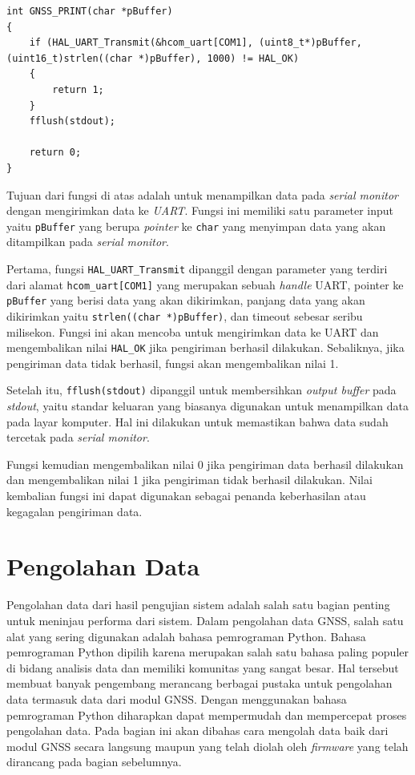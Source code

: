 \vspace{0.3cm}
\begin{lstlisting}[style=mystyle, caption={Fungsi \texttt{GNSS\_PRINT}}, label={lst: 3-gnss-print}]
int GNSS_PRINT(char *pBuffer)
{
	if (HAL_UART_Transmit(&hcom_uart[COM1], (uint8_t*)pBuffer, (uint16_t)strlen((char *)pBuffer), 1000) != HAL_OK)
	{
		return 1;
	}
	fflush(stdout);
	
	return 0;
}
\end{lstlisting}

Tujuan dari fungsi di atas adalah untuk menampilkan data pada \textit{serial monitor} dengan mengirimkan data ke \textit{UART}. Fungsi ini memiliki satu parameter input yaitu \texttt{pBuffer} yang berupa \textit{pointer} ke \texttt{char} yang menyimpan data yang akan ditampilkan pada \textit{serial monitor}.

Pertama, fungsi \texttt{HAL\_UART\_Transmit} dipanggil dengan parameter yang terdiri dari alamat \texttt{hcom\_uart[COM1]} yang merupakan sebuah \textit{handle} UART, pointer ke \texttt{pBuffer} yang berisi data yang akan dikirimkan, panjang data yang akan dikirimkan yaitu \texttt{strlen((char *)pBuffer)}, dan timeout sebesar seribu milisekon. Fungsi ini akan mencoba untuk mengirimkan data ke UART dan mengembalikan nilai \texttt{HAL\_OK} jika pengiriman berhasil dilakukan. Sebaliknya, jika pengiriman data tidak berhasil, fungsi akan mengembalikan nilai 1.

Setelah itu, \texttt{fflush(stdout)} dipanggil untuk membersihkan \textit{output buffer} pada \textit{stdout}, yaitu standar keluaran yang biasanya digunakan untuk menampilkan data pada layar komputer. Hal ini dilakukan untuk memastikan bahwa data sudah tercetak pada \textit{serial monitor}.

Fungsi kemudian mengembalikan nilai 0 jika pengiriman data berhasil dilakukan dan mengembalikan nilai 1 jika pengiriman tidak berhasil dilakukan. Nilai kembalian fungsi ini dapat digunakan sebagai penanda keberhasilan atau kegagalan pengiriman data.

\section{Pengolahan Data}
Pengolahan data dari hasil pengujian sistem adalah salah satu bagian penting untuk meninjau performa dari sistem. Dalam pengolahan data GNSS, salah satu alat yang sering digunakan adalah bahasa pemrograman Python. Bahasa pemrograman Python dipilih karena merupakan salah satu bahasa paling populer di bidang analisis data dan memiliki komunitas yang sangat besar. Hal tersebut membuat banyak pengembang merancang berbagai pustaka untuk pengolahan data termasuk data dari modul GNSS. Dengan menggunakan bahasa pemrograman Python diharapkan dapat mempermudah dan mempercepat proses pengolahan data. Pada bagian ini akan dibahas cara mengolah data baik dari modul GNSS secara langsung maupun yang telah diolah oleh \textit{firmware} yang telah dirancang pada bagian sebelumnya.

